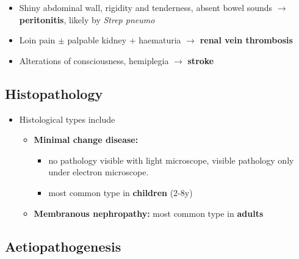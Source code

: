 \documentclass[
  12pt,
]{memoir}
\providecommand{\tightlist}{%
  \setlength{\itemsep}{0pt}\setlength{\parskip}{0pt}}
\begin{document}
\begin{itemize}
  \begin{itemize}
  \tightlist
  \item
    Shiny abdominal wall, rigidity and tenderness, absent bowel sounds
    \(\rightarrow\) \textbf{peritonitis}, likely by \emph{Strep pneumo}
  \item
    Loin pain \(\pm\) palpable kidney + haematuria \(\rightarrow\)
    \textbf{renal vein thrombosis}
  \item
    Alterations of consciousness, hemiplegia \(\rightarrow\)
    \textbf{stroke}
  \end{itemize}
\end{itemize}

\hypertarget{histopathology}{%
\subsection{Histopathology}\label{histopathology}}

\begin{itemize}
\tightlist
\item
  Histological types include

  \begin{itemize}
  \tightlist
  \item
    \textbf{Minimal change disease:}

    \begin{itemize}
    \tightlist
    \item
      no pathology visible with light microscope, visible pathology only
      under electron microscope.
    \item
      most common type in \textbf{children} (2-8y)
    \end{itemize}
  \item
    \textbf{Membranous nephropathy:} most common type in \textbf{adults}
  \end{itemize}
\end{itemize}

\hypertarget{aetiopathogenesis}{%
\subsection{Aetiopathogenesis}\label{aetiopathogenesis}}
\end{document}
